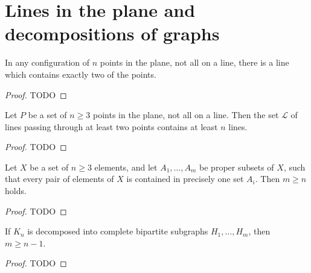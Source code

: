 \chapter{Lines in the plane and decompositions of graphs}

\begin{theorem}
  \label{ch11_theorem1}
  In any configuration of \(n\) points in the plane, not all on a line,
  there is a line which contains exactly two of the points.
\end{theorem}
\begin{proof}
  TODO
\end{proof}

\begin{theorem}
  \label{ch11_theorem2}
  Let \(P\) be a set of \(n\ge 3\) points in the plane, not all on a line.
  Then the set \(\mathcal{L}\) of lines passing through at least two points contains at least
  \(n\) lines.
\end{theorem}
\begin{proof}
  TODO
\end{proof}

\begin{theorem}
  \label{ch11_theorem3}
  Let \(X\) be a set of \(n\ge 3\) elements, and let \(A_1, \dots, A_m\) be
  proper subsets of \(X\), such that every pair of elements of \(X\) is contained in
  precisely one set \(A_i\). Then \(m\ge n\) holds.
\end{theorem}
\begin{proof}
  TODO
\end{proof}

\begin{theorem}
  \label{ch11_theorem4}
  If \(K_n\) is decomposed into complete bipartite subgraphs
  \(H_1, \dots, H_m\), then \(m \ge n - 1\).
\end{theorem}
\begin{proof}
  TODO
\end{proof}
